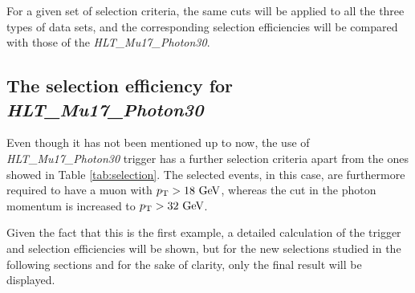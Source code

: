 \documentclass[11pt, a4paper]{article}
\newcommand{\GeV}{\textrm{ }\mathrm{GeV}}
\newcommand{\pt}{p_{\rm T}}
\begin{document}
For a given set of selection criteria, the same cuts will be applied to all the three types of data sets, and the corresponding selection efficiencies will be compared with those of the {\it HLT\_Mu17\_Photon30}.

\subsection{The selection efficiency for {\it HLT\_Mu17\_Photon30}}
Even though it has not been mentioned up to now, the use of {\it HLT\_Mu17\_Photon30} trigger has a further selection criteria apart from the ones showed in Table \ref{tab:selection}. The selected events, in this case, are furthermore required to have a muon with $\pt > 18\GeV$, whereas the cut in the photon momentum is increased to $\pt > 32\GeV$.

Given the fact that this is the first example, a detailed calculation of the trigger and selection efficiencies will be shown, but for the new selections studied in the following sections and for the sake of clarity, only the final result will be displayed.

\begin{table}[htbp]
  \centering
      \caption{Example calculation of the trigger and selection efficiencies for the trigger {\it HLT\_Mu17\_Photon30} and selection cuts: $\pt^{\mu}>18\GeV$ and $\pt^{\gamma}>32\GeV$.
  \label{tab:addlabel}}
\end{table}%
\end{document}
